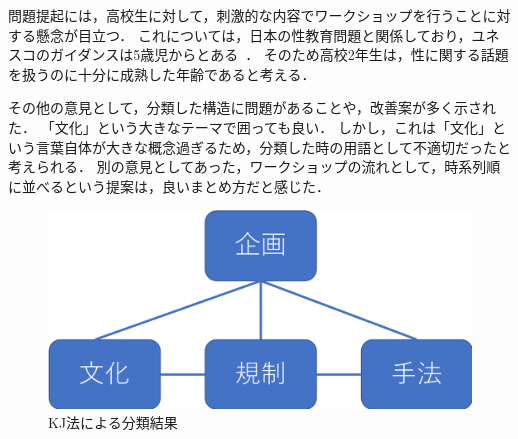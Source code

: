 \documentclass[uplatex,a4paper]{jsarticle}
\begin{document}
問題提起には，高校生に対して，刺激的な内容でワークショップを行うことに対する懸念が目立つ．
これについては，日本の性教育問題と関係しており，ユネスコのガイダンスは5歳児からとある~\cite{40021294461}．
そのため高校2年生は，性に関する話題を扱うのに十分に成熟した年齢であると考える．

その他の意見として，分類した構造に問題があることや，改善案が多く示された．
「文化」という大きなテーマで囲っても良い．
しかし，これは「文化」という言葉自体が大きな概念過ぎるため，分類した時の用語として不適切だったと考えられる．
別の意見としてあった，ワークショップの流れとして，時系列順に並べるという提案は，良いまとめ方だと感じた．




\begin{figure}[htb]
\begin{center}
    \includegraphics[width=14cm]{figs/propose.png}
\end{center}
\caption{KJ法による分類結果}
\label{fig:propose}
\end{figure}




\end{document}
